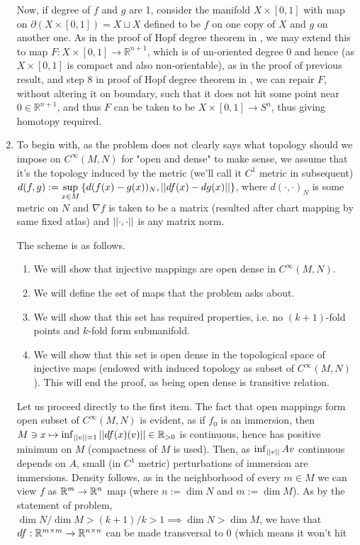 \documentclass[8pt]{article} %
\begin{document}
\begin{enumerate}[label=\bfseries \arabic*.]
		Now, if degree of $f$ and $g$ are 1, consider the manifold $X\times[0,1]$ with map on $\partial(X\times[0,1])=X\sqcup X$
		defined to be $f$ on one copy of $X$ and $g$ on another one. As in the proof of Hopf degree theorem in \cite{gp}, we may extend
		this to map $F:X\times[0,1]\to\mathbb{R}^{n+1}$, which is of un-oriented degree $0$ and hence (as $X\times[0,1]$ is compact and
		also non-orientable), as in the proof of previous result, and step 8 in proof of Hopf degree theorem in \cite{gp}, we can
		repair $F$, without altering it on boundary, such that it does not hit some point near $0\in\mathbb{R}^{n+1}$, and
		thus $F$ can be taken to be $X\times[0,1]\to S^n$, thus giving homotopy required.
	\item To begin with, as the problem does not clearly says what topology should we impose on $C^{\infty}(M,N)$ for "open and dense" to make
		sense, we assume that it's the topology induced by the metric (we'll call it $C^1$ metric in subsequent)
		$d(f,g):=\sup_{x\in M}\mycbra{d(f(x)-g(x))_N,\mynorm{df(x)
		-dg(x)}}$, where $d(\cdot,\cdot)_N$ is some metric on $N$ and $\nabla f$ is taken to be a matrix (resulted after chart
		mapping by same fixed atlas) and $\left|\left|\cdot,\cdot\right|\right|$ is any matrix norm.

		The scheme is as follows.
		\begin{enumerate}[label=\arabic*.]
			\item We will show that injective mappings are open dense in $C^{\infty}(M,N)$.
			\item We will define the set of maps that the problem asks about.
			\item We will show that this set has required properties, i.e. no $(k+1)$-fold points and $k$-fold form submanifold.
			\item We will show that this set is open dense in the topological space of injective maps (endowed
				with induced topology as subset of $C^{\infty}(M,N)$). This will end the proof,
				as being open dense is transitive relation.
		\end{enumerate}
		Let us proceed directly to the first item. The fact that open mappings form open subset of $C^{\infty}(M,N)$ is evident,
		as if $f_0$ is an immersion, then $M\ni x\mapsto\inf_{\left|\left|v\right|\right|=1}\left|\left|df(x)(v)\right|\right|\in\mathbb{R}_{>0}$ is continuous, hence
		has positive minimum on $M$ (compactness of $M$ is used). Then, as $\inf_{\left|\left|v\right|\right|}{Av}$ continuous depends on $A$, small (in
		$C^1$ metric) perturbations of immersion are immersions. Density follows, as in the neighborhood of every $m\in M$ we can view
		$f$ as $\mathbb{R}^{m}\to\mathbb{R}^{n}$ map (where $n:=\dim N$ and $m:=\dim M$). As by the statement of problem, $\dim N/\dim M>(k+1)/k>1\implies
		\dim N>\dim M$, we have that $df:\mathbb{R}^{m\times m}\to\mathbb{R}^{n\times n}$ can be made transversal to $0$ (which means it won't hit


\end{enumerate}
\end{document}
